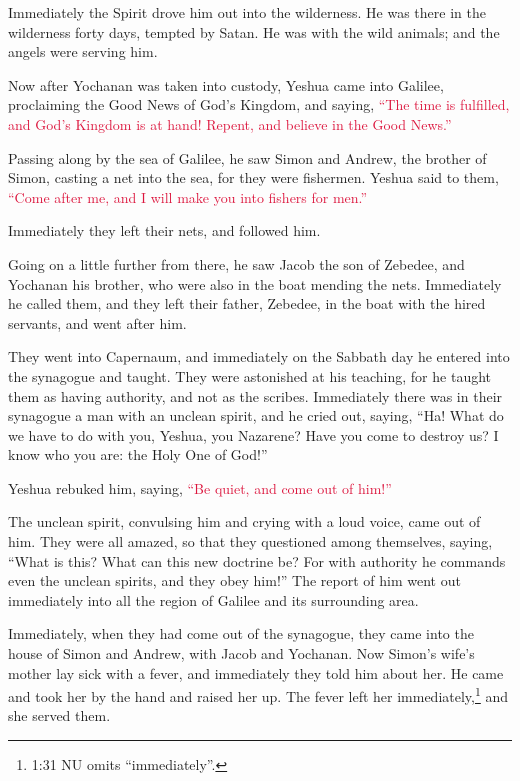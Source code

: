 \myverse{}Immediately the Spirit drove him out into the wilderness.
\myverse{}He was there in the wilderness forty days, tempted by Satan. He was with the
wild animals; and the angels were serving him.

\myverse{}Now after Yochanan was taken into custody, Yeshua came into Galilee,
proclaiming the Good News of God’s Kingdom,
\myverse{}and saying,
\textcolor{crimson}{“The time is fulfilled, and God’s Kingdom is at hand! Repent, and believe in the Good News.”}

\myverse{}Passing along by the sea of Galilee, he saw Simon and Andrew,
the brother of Simon, casting a net into the sea, for they were fishermen.
\myverse{}Yeshua said to them,
\textcolor{crimson}{“Come after me, and I will make you into fishers for men.”}

\myverse{}Immediately they left their nets, and followed him.

\myverse{}Going on a little further from there, he saw Jacob the son of
Zebedee, and Yochanan his brother, who were also in the boat mending the nets.
\myverse{}Immediately he called them, and they left their father, Zebedee, in the boat
with the hired servants, and went after him.

\myverse{}They went into Capernaum, and immediately on the Sabbath day
he entered into the synagogue and taught.
\myverse{}They were astonished at his teaching, for he taught them as having authority,
and not as the scribes.
\myverse{}Immediately there was in their synagogue a man with an unclean spirit, and
he cried out,
\myverse{}saying, “Ha! What do we have to do with you, Yeshua, you Nazarene? Have you
come to destroy us? I know who you are: the Holy One of God!”

\myverse{}Yeshua rebuked him, saying,
\textcolor{crimson}{“Be quiet, and come out of him!”
}

\myverse{}The unclean spirit, convulsing him and crying with a loud voice,
came out of him.
\myverse{}They were all amazed, so that they questioned among themselves, saying, “What
is this? What can this new doctrine be? For with authority he commands even the unclean spirits, and they
obey him!”
\myverse{}The report of him went out immediately into all the region of Galilee and
its surrounding area.

\myverse{}Immediately, when they had come out of the synagogue, they came
into the house of Simon and Andrew, with Jacob and Yochanan.
\myverse{}Now Simon’s wife’s mother lay sick with a fever, and immediately they told
him about her.
\myverse{}He came and took her by the hand and raised her up. The fever left her immediately,\footnote{1:31 NU omits “immediately”.} and she served them.

